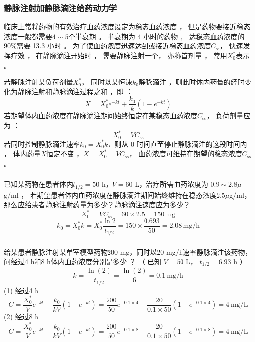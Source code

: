 \documentclass[dvipsnames, svgnames, x11names]{beamer}
\begin{document}
\begin{frame}
    \frametitle{静脉注射加静脉滴注给药动力学}
    临床上常将药物的有效治疗血药浓度设定为稳态血药浓度 ， 但是药物要接近稳态浓度一般都需要$4\sim 5$个半衰期 。 半衰期为 4 小时的药物 ， 达稳态血药浓度的 90\%需要 13.3 小时 。 为了使血药浓度迅速达到或接近稳态血药浓度$C_\mathrm{ss}$， 快速发挥疗效 ， 在静脉滴注开始时 ， 需要静脉注射一个， 亦称首剂量 ， 常用$X_0^*$表示 。

    若静脉注射某负荷剂量$X_0^*$， 同时以某恒速$k_0$静脉滴注 ，则此时体内药量的经时变化为静脉注射和静脉滴注过程之和 ，即 ：
    \[
        X=X_{0}^{*}e^{-kt}+\frac{k_{0}}{k}(1-e^{-kt})
    \]
    若期望体内血药浓度在静脉滴注期间始终恒定在某稳态血药浓度$C_\mathrm{ss}$， 负荷剂量应为 ：
    \[
        X_{0}^{*}=VC_\mathrm{ss}
    \]
    若同时控制静脉滴注速率$k_{0}=X_{0}^{*}k$，则从 0 时间直至停止静脉滴注的这段时间内 ， 体内药量$X$恒定不变 ，$X=X_{0}^{*}=VC_\mathrm{ss}$， 血药浓度可维持在期望的稳态浓度$C_\mathrm{ss}$。
\end{frame}


\begin{frame}[t]
    \frametitle{}
\begin{example}
    已知某药物在患者体内$t_{1/2}= 50$ h，$V=60$ L，治疗所需血药浓度为 $0.9\sim 2.8 \mu$g/ml ， 若期望患者体内血药浓度在静脉滴注期间始终维持在稳态浓度$2.5 \mu$g/ml，那么应给患者静脉注射药量为多少？静脉滴注速度应为多少？
    \tcblower
    \pause
    \[
        X_0^* = VC_\mathrm{ss} = 60\times 2.5 = 150 \ \mathrm{mg}
    \]
    \[
        k_0 = X_{0}^{*}k = X_{0}^{*}\frac{\ln 2}{t_{1/2}} = 150\times \frac{0.693}{50} = 2.08 \ \mathrm{mg/h}
    \]
    \end{example}
\end{frame}


\begin{frame}[t]
    \frametitle{}
    \begin{example}
        给某患者静脉注射某单室模型药物200 mg，同时以20 mg/h速率静脉滴注该药物，问经过4 h和8 h体内血药浓度分别是多少 ？ （ 已知 $V=50$ L， $t_{1/2}= 6.93$ h ）
        \tcblower
        \pause
    \[
        k = \frac{\ln(2)}{t_{1/2}} = \frac{\ln(2)}{6} = 0.1 \ \mathrm{mg/h}
    \]
    (1) 经过4 h
    \[
        C = \frac{X_{0}^{*}}{V}e^{-kt}+\frac{k_{0}}{kV}(1-e^{-kt}) = \frac{200}{50}e^{-0.1\times 4}+\frac{20}{0.1\times 50}(1-e^{-0.1\times 4}) = 4 \ \mathrm{mg/L}
    \]
    (2) 经过8 h
    \[
        C = \frac{X_{0}^{*}}{V}e^{-kt}+\frac{k_{0}}{kV}(1-e^{-kt}) = \frac{200}{50}e^{-0.1\times 8}+\frac{20}{0.1\times 50}(1-e^{-0.1\times 8}) = 4 \ \mathrm{mg/L}
    \]
    \end{example}
\end{frame}
\end{document}
